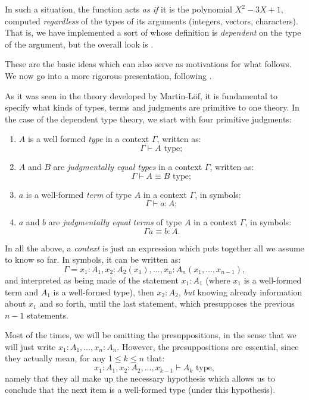 In such a situation, the function acts \emph{as if} it is the polynomial
$ X^2 - 3X + 1 $, computed \emph{regardless} of the types of its arguments
(integers, vectors, characters). That is, we have implemented a sort of
 whose definition is \emph{dependent} on the type
of the argument, but the overall look is .

\vspace{0.3cm}

These are the basic ideas which can also serve as motivations for what
follows. We now go into a more rigorous presentation, following
\cite{rijke}.

As it was seen in the theory developed by Martin-L\"{o}f, it is fundamental
to specify what kinds of types, terms and judgments are primitive to
one theory. In the case of the dependent type theory, we start with
four primitive judgments:
\begin{enumerate}[(1)]
\item $ A $ is a well formed \emph{type} in a context $ \Gamma $,
  written as:
  \[
    \Gamma \vdash A \text{ type};
  \]
\item $ A $ and $ B $ are \emph{judgmentally equal types} in
  a context $ \Gamma $, written as:
  \[
    \Gamma \vdash A \equiv B \text{ type};
  \]
\item $ a $ is a well-formed \emph{term} of type $ A $ in a context $ \Gamma $,
  in symbols:
  \[
    \Gamma \vdash a : A;
  \]
\item $ a $ and $ b $ are \emph{judgmentally equal terms} of type $ A $
  in a context $ \Gamma $, in symbols:
  \[
    \Gamma a \equiv b : A.
  \]
\end{enumerate}

In all the above, a \emph{context} is just an expression which puts together
all we assume to know so far. In symbols, it can be written as:
\[
  \Gamma = x_1 : A_1, x_2 : A_2(x_1), \dots, x_n : A_n(x_1, \dots, x_{n-1}),
\]
and interpreted as being made of the statement $ x_1 : A_1 $ (where $ x_1 $
is a well-formed term and $ A_1 $ is a well-formed type), then
$ x_2 : A_2 $, \emph{but} knowing already information about $ x_1 $
and so forth, until the last statement, which presupposes the previous
$ n - 1 $ statements.

Most of the times, we will be omitting the presuppositions, in the
sense that we will just write $ x_1 : A_1, \dots, x_n : A_n $.
However, the presuppositions are essential, since they actually mean,
for any $ 1 \leq k \leq n $ that:
\[
  x_1 : A_1, x_2 : A_2, \dots, x_{k-1} \vdash A_k \text{ type},
\]
namely that they all make up the necessary hypothesis which allows
us to conclude that the next item is a well-formed type (under
this hypothesis).

